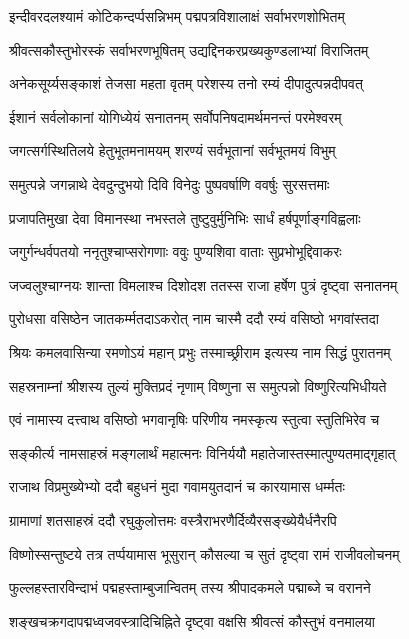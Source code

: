 \twolineshloka
{इन्दीवरदलश्यामं कोटिकन्दर्प्पसन्निभम्}
{पद्मपत्रविशालाक्षं सर्वाभरणशोभितम्}%

\twolineshloka
{श्रीवत्सकौस्तुभोरस्कं सर्वाभरणभूषितम्}
{उद्यद्दिनकरप्रख्यकुण्डलाभ्यां विराजितम्}%

\twolineshloka
{अनेकसूर्य्यसङ्काशं तेजसा महता वृतम्}
{परेशस्य तनो रम्यं दीपादुत्पन्नदीपवत्}%

\twolineshloka
{ईशानं सर्वलोकानां योगिध्येयं सनातनम्}
{सर्वोपनिषदामर्थमनन्तं परमेश्वरम्}%

\twolineshloka
{जगत्सर्गस्थितिलये हेतुभूतमनामयम्}
{शरण्यं सर्वभूतानां सर्वभूतमयं विभुम्}%

\twolineshloka
{समुत्पन्ने जगन्नाथे देवदुन्दुभयो दिवि}
{विनेदुः पुष्पवर्षाणि ववर्षुः सुरसत्तमाः}%

\twolineshloka
{प्रजापतिमुखा देवा विमानस्था नभस्तले}
{तुष्टुवुर्मुनिभिः सार्धं हर्षपूर्णाङ्गविह्वलाः}%

\twolineshloka
{जगुर्गन्धर्वपतयो ननृतुश्चाप्सरोगणाः}
{ववुः पुण्यशिवा वाताः सुप्रभोभूद्दिवाकरः}%

\twolineshloka
{जज्वलुश्चाग्नयः शान्ता विमलाश्च दिशोदश}
{ततस्स राजा हर्षेण पुत्रं दृष्ट्वा सनातनम्}%

\twolineshloka
{पुरोधसा वसिष्ठेन जातकर्म्मतदाऽकरोत्}
{नाम चास्मै ददौ रम्यं वसिष्ठो भगवांस्तदा}%

\twolineshloka
{श्रियः कमलवासिन्या रमणोऽयं महान् प्रभुः}
{तस्माच्छ्रीराम इत्यस्य नाम सिद्धं पुरातनम्}%

\twolineshloka
{सहस्रनाम्नां श्रीशस्य तुल्यं मुक्तिप्रदं नृणाम्}
{विष्णुना स समुत्पन्नो विष्णुरित्यभिधीयते}%

\twolineshloka
{एवं नामास्य दत्त्वाथ वसिष्ठो भगवानृषिः}
{परिणीय नमस्कृत्य स्तुत्वा स्तुतिभिरेव च}%

\twolineshloka
{सङ्कीर्त्य नामसाहस्रं मङ्गलार्थं महात्मनः}
{विनिर्ययौ महातेजास्तस्मात्पुण्यतमाद्गृहात्}%

\twolineshloka
{राजाथ विप्रमुख्येभ्यो ददौ बहुधनं मुदा}
{गवामयुतदानं च कारयामास धर्म्मतः}%

\twolineshloka
{ग्रामाणां शतसाहस्रं ददौ रघुकुलोत्तमः}
{वस्त्रैराभरणैर्दिव्यैरसङ्ख्येयैर्धनैरपि}%

\twolineshloka
{विष्णोस्सन्तुष्टये तत्र तर्प्पयामास भूसुरान्}
{कौसल्या च सुतं दृष्ट्वा रामं राजीवलोचनम्}%

\twolineshloka
{फुल्लहस्तारविन्दाभं पद्महस्ताम्बुजान्वितम्}
{तस्य श्रीपादकमले पद्माब्जे च वरानने}%

\twolineshloka
{शङ्खचक्रगदापद्मध्वजवस्त्रादिचिह्निते}
{दृष्ट्वा वक्षसि श्रीवत्सं कौस्तुभं वनमालया}%


